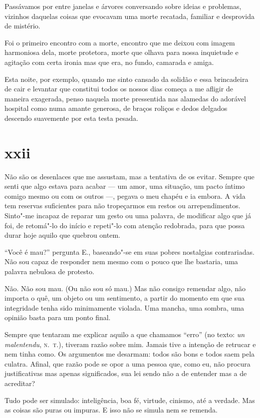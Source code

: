 Passávamos por entre janelas e árvores conversando sobre ideias e
problemas, vizinhos daquelas coisas que evocavam uma morte recatada,
familiar e desprovida de mistério.

Foi o primeiro encontro com a morte, encontro que me deixou com
imagem harmoniosa dela, morte protetora, morte que olhava para nossa
inquietude e agitação com certa ironia mas que era, no fundo, camarada
e amiga.

Esta noite, por exemplo, quando me sinto cansado da solidão e
essa brincadeira de cair e levantar que constitui todos os
nossos dias começa a me afligir de maneira exagerada, penso naquela
morte pressentida nas alamedas do adorável hospital como numa amante
generosa, de braços roliços e dedos delgados descendo suavemente por
esta testa pesada.

\section{xxii}

Não são os desenlaces que me assustam, mas a tentativa de os evitar. Sempre que
senti que algo estava para acabar --- um amor, uma situação, um pacto
íntimo comigo mesmo ou com os outros ---, pegava o meu chapéu e ia embora.
A vida tem reservas suficientes para não tropeçarmos em restos ou
arrependimentos. Sinto"-me incapaz de reparar um gesto ou uma palavra, de
modificar algo que já foi, de retomá"-lo do início e repeti"-lo
com atenção redobrada, para que possa durar hoje aquilo que quebrou
ontem.

``Você é mau?'' pergunta E., baseando"-se em suas pobres nostalgias
contrariadas. Não sou capaz de responder nem mesmo com o pouco que
lhe bastaria, uma palavra nebulosa de protesto.

Não. Não sou mau. (Ou não sou só mau.) Mas não consigo remendar algo,
não importa o quê, um objeto ou um sentimento, a partir do momento em
que sua integridade tenha sido minimamente violada. Uma mancha, uma
sombra, uma opinião basta para um ponto final.

Sempre que tentaram me explicar aquilo a que chamamos ``erro'' (no
texto: \emph{un malentendu}, \textsc{n.~t.}), tiveram razão sobre mim. Jamais tive
a intenção de retrucar e nem tinha como. Os argumentos me desarmam:
todos são bons e todos saem pela culatra. Afinal, que razão pode se opor
a uma pessoa que, como eu, não procura justificativas mas apenas
significados, sua lei sendo não a de entender mas a de acreditar?

Tudo pode ser simulado: inteligência, boa fé, virtude, cinismo, até a
verdade. Mas as coisas são puras ou impuras. E isso não se simula nem
se remenda.

